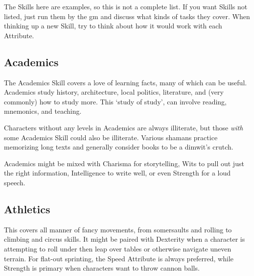 \begin{multicols}{2}
The Skills here are examples, so this is not a complete list.
If you want Skills not listed, just run them by the \gls{gm} and discuss what kinds of tasks they cover.
When thinking up a new Skill, try to think about how it would work with each Attribute.

\subsection{Academics}

The Academics Skill covers a love of learning facts, many of which can be useful.
Academics study history, architecture, local politics, literature, and (very commonly) how to study more.
This `study of study', can involve reading, mnemonics, and teaching.


Characters without any levels in Academics are always illiterate, but those \emph{with} some Academics Skill could also be illiterate.
Various shamans practice memorizing long texts and generally consider books to be a dimwit's crutch.

Academics might be mixed with Charisma for storytelling, Wits to pull out just the right information, Intelligence to write well, or even Strength for a loud speech.

\subsection{Athletics}

This covers all manner of fancy movements, from somersaults and rolling to climbing and circus skills.
It might be paired with Dexterity when a character is attempting to roll under then leap over tables or otherwise navigate uneven terrain.
For flat-out sprinting, the Speed Attribute is always preferred, while Strength is primary when characters want to throw cannon balls.


\end{multicols}
